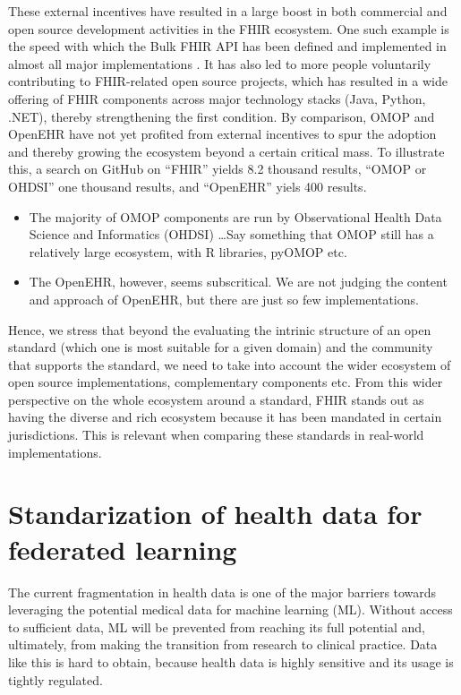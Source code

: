 \documentclass[
  authoryear]{elsarticle}
\providecommand{\tightlist}{%
  \setlength{\itemsep}{0pt}\setlength{\parskip}{0pt}}\usepackage{longtable,booktabs,array}
\begin{document}
These external incentives have resulted in a large boost in both
commercial and open source development activities in the FHIR ecosystem.
One such example is the speed with which the Bulk FHIR API has been
defined and implemented in almost all major implementations
\citep{mandl2020push, jones2021landscape}. It has also led to more
people voluntarily contributing to FHIR-related open source projects,
which has resulted in a wide offering of FHIR components across major
technology stacks (Java, Python, .NET), thereby strengthening the first
condition. By comparison, OMOP and OpenEHR have not yet profited from
external incentives to spur the adoption and thereby growing the
ecosystem beyond a certain critical mass. To illustrate this, a search
on GitHub on ``FHIR'' yields 8.2 thousand results, ``OMOP or OHDSI'' one
thousand results, and ``OpenEHR'' yiels 400 results.

\begin{itemize}
\tightlist
\item
  The majority of OMOP components are run by Observational Health Data
  Science and Informatics (OHDSI) \ldots Say something that OMOP still
  has a relatively large ecosystem, with R libraries, pyOMOP etc.
\item
  The OpenEHR, however, seems subscritical. We are not judging the
  content and approach of OpenEHR, but there are just so few
  implementations.
\end{itemize}

Hence, we stress that beyond the evaluating the intrinic structure of an
open standard (which one is most suitable for a given domain) and the
community that supports the standard, we need to take into account the
wider ecosystem of open source implementations, complementary components
etc. From this wider perspective on the whole ecosystem around a
standard, FHIR stands out as having the diverse and rich ecosystem
because it has been mandated in certain jurisdictions. This is relevant
when comparing these standards in real-world implementations.

\section{Standarization of health data for federated
learning}\label{standarization-of-health-data-for-federated-learning}

The current fragmentation in health data is one of the major barriers
towards leveraging the potential medical data for machine learning (ML).
Without access to sufficient data, ML will be prevented from reaching
its full potential and, ultimately, from making the transition from
research to clinical practice. Data like this is hard to obtain, because
health data is highly sensitive and its usage is tightly regulated.
\end{document}
